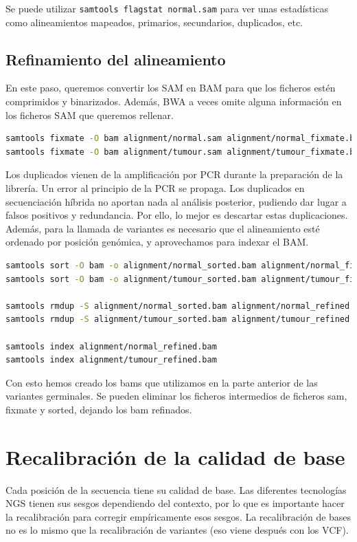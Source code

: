 Se puede utilizar \texttt{samtools flagstat normal.sam} para ver unas estadísticas como alineamientos mapeados, primarios, secundarios, duplicados, etc. 

\subsection{Refinamiento del alineamiento}
En este paso, queremos convertir los SAM en BAM para que los ficheros estén comprimidos y binarizados. Además, BWA a veces omite alguna información en los ficheros SAM que queremos rellenar.
\begin{lstlisting}[language=bash]
samtools fixmate -O bam alignment/normal.sam alignment/normal_fixmate.bam
samtools fixmate -O bam alignment/tumour.sam alignment/tumour_fixmate.bam
\end{lstlisting}

Los duplicados vienen de la amplificación por PCR durante la preparación de la librería. Un error al principio de la PCR se propaga. Los duplicados en secuenciación híbrida no aportan nada al análisis posterior, pudiendo dar lugar a falsos positivos y redundancia. Por ello, lo mejor es descartar estas duplicaciones. Además, para la llamada de variantes es necesario que el alineamiento esté ordenado por posición genómica, y aprovechamos para indexar el BAM.
\begin{lstlisting}[language=bash]
samtools sort -O bam -o alignment/normal_sorted.bam alignment/normal_fixmate.bam
samtools sort -O bam -o alignment/tumour_sorted.bam alignment/tumour_fixmate.bam

samtools rmdup -S alignment/normal_sorted.bam alignment/normal_refined.bam
samtools rmdup -S alignment/tumour_sorted.bam alignment/tumour_refined.bam

samtools index alignment/normal_refined.bam
samtools index alignment/tumour_refined.bam
\end{lstlisting}

Con esto hemos creado los bams que utilizamos en la parte anterior de las variantes germinales. Se pueden eliminar los ficheros intermedios de ficheros sam, fixmate y sorted, dejando los bam refinados.

\section{Recalibración de la calidad de base}
Cada posición de la secuencia tiene su calidad de base. Las diferentes tecnologías NGS tienen sus sesgos dependiendo del contexto, por lo que es importante hacer la recalibración para corregir empíricamente esos sesgos. La recalibración de bases no es lo mismo que la recalibración de variantes (eso viene después con los VCF).

